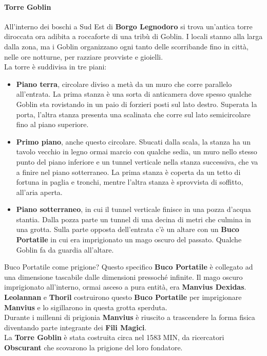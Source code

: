 \documentclass[10pt,twoside,onecolumn,openany]{book}
\begin{document}
\paragraph{Torre Goblin} All'interno dei boschi a Sud Est di \textbf{Borgo Legnodoro} si trova un'antica torre diroccata ora adibita a roccaforte di una tribù di Goblin. I locali stanno alla larga dalla zona, ma i Goblin organizzano ogni tanto delle scorribande fino in città, nelle ore notturne, per razziare provviste e gioielli.\\
La torre è suddivisa in tre piani:
\begin{itemize}
\item \textbf{Piano terra}, circolare diviso a metà da un muro che corre parallelo all'entrata. La prima stanza è una sorta di anticamera dove spesso qualche Goblin sta rovistando in un paio di forzieri posti sul lato destro. Superata la porta, l'altra stanza presenta una scalinata che corre sul lato semicircolare fino al piano superiore.
\item \textbf{Primo piano}, anche questo circolare. Sbucati dalla scala, la stanza ha un tavolo vecchio in legno ormai marcio con qualche sedia, un muro nello stesso punto del piano inferiore e un tunnel verticale nella stanza successiva, che va a finire nel piano sotterraneo. La prima stanza è coperta da un tetto di fortuna in paglia e tronchi, mentre l'altra stanza è sprovvista di soffitto, all'aria aperta.
\item \textbf{Piano sotterraneo}, in cui il tunnel verticale finisce in una pozza d'acqua stantia. Dalla pozza parte un tunnel di una decina di metri che culmina in una grotta. Sulla parte opposta dell'entrata c'è un altare con un \textbf{Buco Portatile} in cui era imprigionato un mago oscuro del passato. Qualche Goblin fa da guardia all'altare.
\end{itemize}
\begin{commentbox}{{Buco Portatile come prigione?}}
	Questo specifico \textbf{Buco Portatile} è collegato ad una dimensione tascabile dalle dimensioni pressoché infinite. Il mago oscuro imprigionato all'interno, ormai asceso a pura entità, era \textbf{Manvius Dexidas}. \textbf{Leolannan} e \textbf{Thoril} costruirono questo \textbf{Buco Portatile} per imprigionare \textbf{Manvius} e lo sigillarono in questa grotta sperduta.\\
	Durante i millenni di prigionia \textbf{Manvius} è riuscito a trascendere la forma fisica diventando parte integrante dei \textbf{Fili Magici}.\\
	La \textbf{Torre Goblin} è stata costruita circa nel 1583 MIN, da ricercatori \textbf{Obscurant} che scovarono la prigione del loro fondatore.
\end{commentbox}
\end{document}
